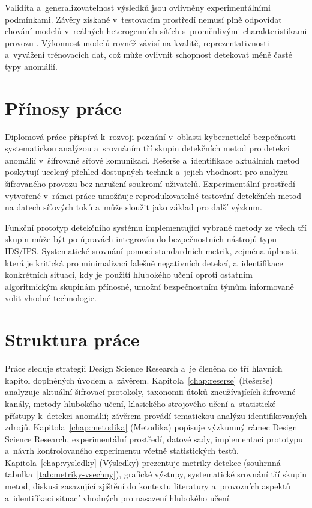 Validita a~generalizovatelnost výsledků jsou ovlivněny experimentálními podmínkami. Závěry získané v~testovacím prostředí nemusí plně odpovídat chování modelů v~reálných heterogenních sítích s~proměnlivými charakteristikami provozu \parencite{Qing2025}. Výkonnost modelů rovněž závisí na kvalitě, reprezentativnosti a~vyvážení trénovacích dat, což může ovlivnit schopnost detekovat méně časté typy anomálií.

\section*{Přínosy práce}

Diplomová práce přispívá k~rozvoji poznání v~oblasti kybernetické bezpečnosti systematickou analýzou a~srovnáním tří skupin detekčních metod pro detekci anomálií v~šifrované síťové komunikaci. Rešerše a~identifikace aktuálních metod poskytují ucelený přehled dostupných technik a~jejich vhodnosti pro analýzu šifrovaného provozu bez narušení soukromí uživatelů. Experimentální prostředí vytvořené v~rámci práce umožňuje reprodukovatelné testování detekčních metod na datech síťových toků a~může sloužit jako základ pro další výzkum.

Funkční prototyp detekčního systému implementující vybrané metody ze všech tří skupin může být po úpravách integrován do bezpečnostních nástrojů typu IDS/IPS. Systematické srovnání pomocí standardních metrik, zejména úplnosti, která je kritická pro minimalizaci falešně negativních detekcí, a~identifikace konkrétních situací, kdy je použití hlubokého učení oproti ostatním algoritmickým skupinám přínosné, umožní bezpečnostním týmům informovaně volit vhodné technologie.

\section*{Struktura práce}

Práce sleduje strategii Design Science Research \parencite{Peffers2007} a~je členěna do tří hlavních kapitol doplněných úvodem a~závěrem. Kapitola~\ref{chap:reserse} (Rešerše) analyzuje aktuální šifrovací protokoly, taxonomii útoků zneužívajících šifrované kanály, metody hlubokého učení, klasického strojového učení a~statistické přístupy k~detekci anomálií; závěrem provádí tematickou analýzu identifikovaných zdrojů. Kapitola~\ref{chap:metodika} (Metodika) popisuje výzkumný rámec Design Science Research, experimentální prostředí, datové sady, implementaci prototypu a~návrh kontrolovaného experimentu včetně statistických testů. Kapitola~\ref{chap:vysledky} (Výsledky) prezentuje metriky detekce (souhrnná tabulka~\ref{tab:metriky-vsechny}), grafické výstupy, systematické srovnání tří skupin metod, diskusi zasazující zjištění do kontextu literatury a~provozních aspektů a~identifikaci situací vhodných pro nasazení hlubokého učení.
